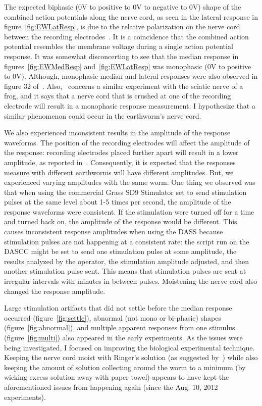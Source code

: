 The expected biphasic (0V to positive to 0V to negative to 0V) shape of the combined action potentials along the nerve cord, as seen in the lateral response in figure~\ref{fig:EWLatResp}, is due to the relative polarization on the nerve cord between the recording electrodes~\cite{KuehJellies,McGillCAP}.  It is a coincidence that the combined action potential resembles the membrane voltage during a single action potential response.  It was somewhat disconcerting to see that the median response in figures~\ref{fig:EWMedResp} and~\ref{fig:EWLatResp} was monophasic (0V to positive to 0V).  Although, monophasic median and lateral responses were also observed in figure 32 of~\cite{StahlMSEE}.  Also,~\cite{McGillCAP} concerns a similar experiment with the sciatic nerve of a frog, and it says that a nerve cord that is crushed at one of the recording electrode will result in a monophasic response measurement.  I hypothesize that a similar phenomenon could occur in the earthworm's nerve cord.

We also experienced inconsistent results in the amplitude of the response waveforms.  The position of the recording electrodes will affect the amplitude of the response: recording electrodes placed further apart will result in a lower amplitude, as reported in~\cite{KuehJellies,McGillCAP}.  Consequently, it is expected that the responses measure with different earthworms will have different amplitudes.  But, we experienced varying amplitudes with the same worm.   One thing we observed was that when using the commercial Grass SD9 Stimulator set to send stimulation pulses at the same level about 1-5 times per second, the amplitude of the response waveforms were consistent.  If the stimulation were turned off for a time and turned back on, the amplitude of the response would be different.  This causes inconsistent response amplitudes when using the DASS because stimulation pulses are not happening at a consistent rate: the script run on the DASCC might be set to send one stimulation pulse at some amplitude, the results analyzed by the operator, the stimulation amplitude adjusted, and then another stimulation pulse sent.  This means that stimulation pulses are sent at irregular intervals with minutes in between pulses.  Moistening the nerve cord also changed the response amplitude.

Large stimulation artifacts that did not settle before the median response occurred (figure~\ref{fig:settle}), abnormal (not mono or bi-phasic) shapes (figure~\ref{fig:abnormal}), and multiple apparent responses from one stimulus (figure~\ref{fig:multi}) also appeared in the early experiments.  As the issues were being investigated, I focused on improving the biological experimental technique.  Keeping the nerve cord moist with Ringer's solution (as suggested by~\cite{Olivo,KuehJellies}) while also keeping the amount of solution collecting around the worm to a minimum (by wicking excess solution away with paper towel) appears to have kept the aforementioned issues from happening again (since the Aug. 10, 2012 experiments).

